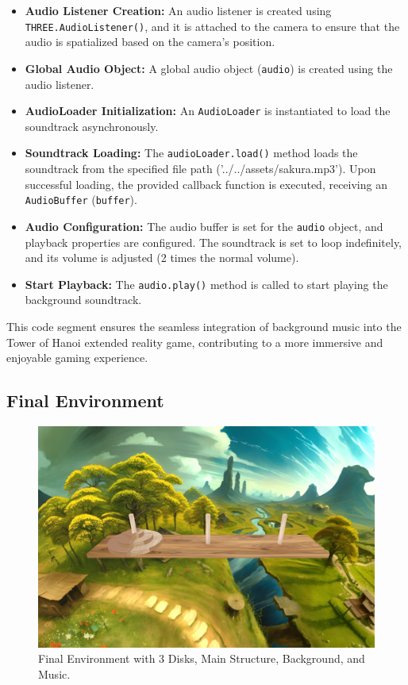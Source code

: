 \documentclass{article}
\begin{document}
\begin{itemize}
    \item \textbf{Audio Listener Creation:} An audio listener is created using \texttt{THREE.AudioListener()}, and it is attached to the camera to ensure that the audio is spatialized based on the camera's position.

    \item \textbf{Global Audio Object:} A global audio object (\texttt{audio}) is created using the audio listener.

    \item \textbf{AudioLoader Initialization:} An \texttt{AudioLoader} is instantiated to load the soundtrack asynchronously.

    \item \textbf{Soundtrack Loading:} The \texttt{audioLoader.load()} method loads the soundtrack from the specified file path ('../../assets/sakura.mp3'). Upon successful loading, the provided callback function is executed, receiving an \texttt{AudioBuffer} (\texttt{buffer}).

    \item \textbf{Audio Configuration:} The audio buffer is set for the \texttt{audio} object, and playback properties are configured. The soundtrack is set to loop indefinitely, and its volume is adjusted (2 times the normal volume).

    \item \textbf{Start Playback:} The \texttt{audio.play()} method is called to start playing the background soundtrack.

\end{itemize}

This code segment ensures the seamless integration of background music into the Tower of Hanoi extended reality game, contributing to a more immersive and enjoyable gaming experience.

\newpage
\subsection{Final Environment}

\begin{figure}[h]
    \centering
    \includegraphics[width=1\textwidth]{img/result.png}
    \caption{Final Environment with 3 Disks, Main Structure, Background, and Music.}
    \label{fig:final_environment}
\end{figure}
\end{document}
